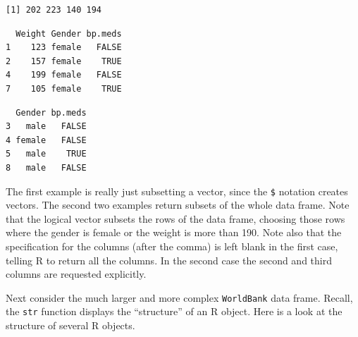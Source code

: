 \documentclass[]{krantz}
\makeatletter
\newenvironment{Shaded}{\begin{snugshade}}{\end{snugshade}}
\newcommand{\DecValTok}[1]{\textcolor[rgb]{0.06,0.06,0.06}{#1}}
\newcommand{\StringTok}[1]{\textcolor[rgb]{0.5,0.5,0.5}{#1}}
\newcommand{\OperatorTok}[1]{\textcolor[rgb]{0.43,0.43,0.43}{\textbf{#1}}}
\newcommand{\NormalTok}[1]{#1}
\newenvironment{kframe}{%
\medskip{}
\setlength{\fboxsep}{.8em}
 \def\at@end@of@kframe{}%
 \ifinner\ifhmode%
  \def\at@end@of@kframe{\end{minipage}}%
  \begin{minipage}{\columnwidth}%
 \fi\fi%
 \def\FrameCommand##1{\hskip\@totalleftmargin \hskip-\fboxsep
 \colorbox{shadecolor}{##1}\hskip-\fboxsep
     \hskip-\linewidth \hskip-\@totalleftmargin \hskip\columnwidth}%
 \MakeFramed {\advance\hsize-\width
   \@totalleftmargin\z@ \linewidth\hsize
   \@setminipage}}%
 {\par\unskip\endMakeFramed%
 \at@end@of@kframe}
\renewenvironment{Shaded}{\begin{kframe}}{\end{kframe}}
\makeatother
\begin{document}
\begin{Shaded}
\end{Shaded}

\begin{verbatim}
[1] 202 223 140 194
\end{verbatim}

\begin{Shaded}
\end{Shaded}

\begin{verbatim}
  Weight Gender bp.meds
1    123 female   FALSE
2    157 female    TRUE
4    199 female   FALSE
7    105 female    TRUE
\end{verbatim}

\begin{Shaded}
\end{Shaded}

\begin{verbatim}
  Gender bp.meds
3   male   FALSE
4 female   FALSE
5   male    TRUE
8   male   FALSE
\end{verbatim}

The first example is really just subsetting a vector, since the
\texttt{\$} notation creates vectors. The second two examples return
subsets of the whole data frame. Note that the logical vector subsets
the rows of the data frame, choosing those rows where the gender is
female or the weight is more than 190. Note also that the specification
for the columns (after the comma) is left blank in the first case,
telling R to return all the columns. In the second case the second and
third columns are requested explicitly.

Next consider the much larger and more complex \texttt{WorldBank} data
frame. Recall, the \texttt{str} function displays the ``structure'' of
an R object. Here is a look at the structure of several R objects.
\end{document}
